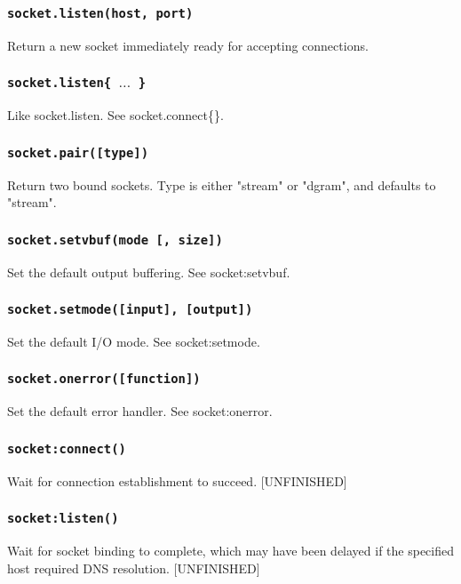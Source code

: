 \documentclass[11pt, oneside]{memoir}
\newcommand*{\fn}[1]{\texttt{#1}\xspace}
\begin{document}
\subsubsection[\fn{socket.listen}]{\fn{socket.listen(host, port)}}
	Return a new socket immediately ready for accepting connections.

\subsubsection[\fn{socket.listen}]{\fn{socket.listen\{ $\ldots$ \}}}
	Like socket.listen. See socket.connect\{\}.

\subsubsection[\fn{socket.pair}]{\fn{socket.pair([type])}}
	Return two bound sockets. Type is either "stream" or "dgram", and
	defaults to "stream".

\subsubsection[\fn{socket.setvbuf}]{\fn{socket.setvbuf(mode [, size])}}
	Set the default output buffering. See socket:setvbuf.

\subsubsection[\fn{socket.setmode}]{\fn{socket.setmode([input], [output])}}
	Set the default I/O mode. See socket:setmode.

\subsubsection[\fn{socket.onerror}]{\fn{socket.onerror([function])}}
	Set the default error handler. See socket:onerror.

\subsubsection[\fn{socket:connect}]{\fn{socket:connect()}}
	Wait for connection establishment to succeed. [UNFINISHED]

\subsubsection[\fn{socket:listen}]{\fn{socket:listen()}}
	Wait for socket binding to complete, which may have been delayed if
	the specified host required DNS resolution. [UNFINISHED]
\end{document}
